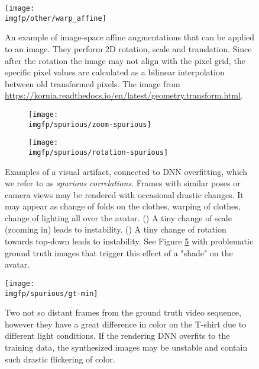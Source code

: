 \begin{figure}
	\centering
	\texttt{[image: \\imgfp/other/warp\_affine]}
	\caption{An example of image-space affine augmentations that can be applied to an image. They perform 2D rotation, scale and translation. Since after the rotation the image may not align with the pixel grid, the specific pixel values are calculated as a bilinear interpolation between old transformed pixels. The image from \href{https://kornia.readthedocs.io/en/latest/geometry.transform.html}{https://kornia.readthedocs.io/en/latest/geometry.transform.html}.}
	\label{fig:image-space-aug-kornia}
\end{figure}

\begin{figure}
	\centering
	\begin{subfigure}[b]{0.49\textwidth}
		\centering
		\texttt{[image: \\imgfp/spurious/zoom-spurious]}
		\caption{}
		\label{fig:spurious_zoom}
	\end{subfigure}
	\hfill
	\begin{subfigure}[b]{0.49\textwidth}
		\centering
		\texttt{[image: \\imgfp/spurious/rotation-spurious]}
		\caption{}
		\label{fig:spurious_rotation}
	\end{subfigure}
	\caption{Examples of a visual artifact, connected to DNN overfitting, which we refer to as \textit{spurious correlations}. Frames with similar poses or camera views may be rendered with occasional drastic changes. It may appear as change of folds on the clothes, warping of clothes, change of lighting all over the avatar. (\protect{}) A tiny change of scale (zooming in) leads to instability. (\protect{}) A tiny change of rotation towards top-down leads to instability. See Figure \ref{fig:overfitting_gt} with problematic ground truth images that trigger this effect of a "shade" on the avatar.}
	\label{fig:spurious}
\end{figure}

\begin{figure}
	\centering
	\texttt{[image: \\imgfp/spurious/gt-min]}
	\caption{Two not so distant frames from the ground truth video sequence, however they have a great difference in color on the T-shirt due to different light conditions. If the rendering DNN overfits to the training data, the synthesized images may be unstable and contain such drastic flickering of color. }
	\label{fig:overfitting_gt}
\end{figure}

